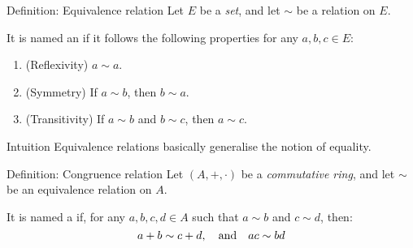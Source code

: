 \documentclass[a4paper]{article}
\begin{document}
\begin{parag}{Definition: Equivalence relation}
    Let $E$ be a \textit{set}, and let $\sim$ be a relation on $E$.

    It is named an  if it follows the following properties for any $a, b, c \in E$:
    \begin{enumerate}
        \item (Reflexivity) $a \sim a$.
        \item (Symmetry) If $a \sim b$, then $b \sim a$.
        \item (Transitivity) If $a\sim b$ and $b \sim c$, then $a \sim c$.
    \end{enumerate}
    
    \begin{subparag}{Intuition}
        Equivalence relations basically generalise the notion of equality.
    \end{subparag}
\end{parag}

\begin{parag}{Definition: Congruence relation}
    Let $\left(A, + , \cdot \right)$ be a \textit{commutative ring}, and let $\sim$ be an equivalence relation on $A$.

    It is named a  if, for any $a, b, c, d \in A$ such that $a \sim b$ and $c \sim d$, then: 
    \[a + b \sim c + d, \quad \text{and} \quad ac \sim bd\]
\end{parag}
\end{document}
